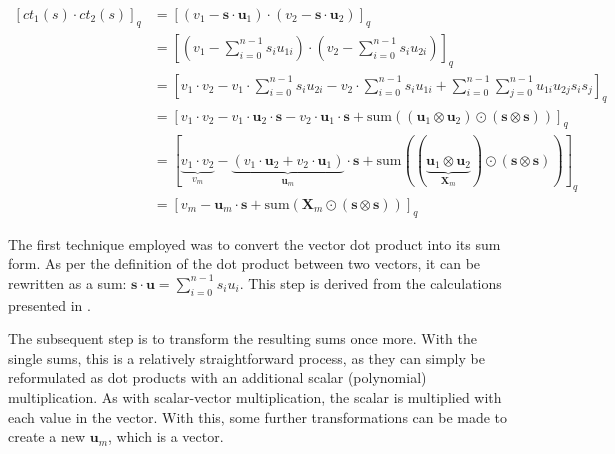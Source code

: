 \begin{equation}
  \begin{split}
    [ct_1(s)\cdot ct_2(s)]_q & = [(v_1-\textbf{s}\cdot \textbf{u}_1) \cdot (v_2-\textbf{s}\cdot \textbf{u}_2)]_q                                                                                                                                                              \\
                             & = [(v_1-\sum_{i=0}^{n-1}s_iu_{1i}) \cdot (v_2-\sum_{i=0}^{n-1}s_iu_{2i})]_q                                                                                                                                                                    \\
                             & = [v_1\cdot v_2 - v_1\cdot \sum_{i=0}^{n-1}s_iu_{2i}- v_2\cdot \sum_{i=0}^{n-1}s_iu_{1i} + \sum_{i=0}^{n-1}\sum_{j=0}^{n-1}u_{1i}u_{2j}s_is_j]_q                                                                                               \\    
                             & = [v_1\cdot v_2 - v_1\cdot \textbf{u}_2\cdot \textbf{s} - v_2\cdot \textbf{u}_1\cdot \textbf{s} + \mathrm{sum}((\textbf{u}_{1}\otimes\textbf{u}_{2})\odot(\textbf{s}\otimes\textbf{s}))]_q                                                              \\
                             & = [\underbrace{v_1\cdot v_2}_{v_m} - \underbrace{(v_1\cdot \textbf{u}_2 + v_2\cdot \textbf{u}_1)}_{\textbf{u}_m}\cdot \textbf{s} + \mathrm{sum}((\underbrace{\textbf{u}_{1}\otimes\textbf{u}_{2}}_{\textbf{X}_m})\odot(\textbf{s}\otimes\textbf{s}))]_q \\
                             & = [v_m - \textbf{u}_m\cdot \textbf{s} + \mathrm{sum}(\textbf{X}_m\odot(\textbf{s}\otimes\textbf{s}))]_q
  \end{split}
  \label{eq:moduleCiphertextMultiplication}
\end{equation}

The first technique employed was to convert the vector dot product into its sum form. As per the definition of the dot product between two vectors, it can be rewritten as a sum: $\textbf{s}\cdot \textbf{u} = \sum_{i=0}^{n-1}s_iu_i$. This step is derived from the calculations presented in \cite{ModHE}.

The subsequent step is to transform the resulting sums once more. With the single sums, this is a relatively straightforward process, as they can simply be reformulated as dot products with an additional scalar (polynomial) multiplication. As with scalar-vector multiplication, the scalar is multiplied with each value in the vector. With this, some further transformations can be made to create a new $\textbf{u}_m$, which is a vector. 

